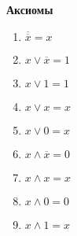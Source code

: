\usepackage{wasysym}
\usepackage{stmaryrd}%




    \renewcommand{\arraystretch}{1.5}

    \begin{minipage}[t]{0.2\textwidth}
        \textbf{Аксиомы}
        \centering
        \begin{enumerate}
            \item $\overline{\overline x} = x$
            \item $x \vee \overline x = 1$
            \item $x \vee 1 = 1$
            \item $x \vee x = x$
            \item $x \vee 0 = x$
            \item $x \wedge \overline x = 0$
            \item $x \wedge x = x$
            \item $x \wedge 0 = 0$
            \item $x \wedge 1 = x$
        \end{enumerate}

    \end{minipage}
